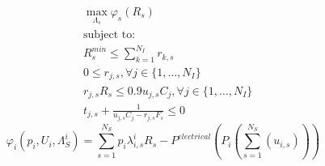 \documentclass[conference]{IEEEtran}
\begin{document}
    \begin{subequations}
      \begin{align}
        &\max_{\Lambda_s} \varphi_s(R_s) \\
        &\text{subject to:} \nonumber \\
        &R_s^{min} \le \sum_{k=1}^{N_I}{r_{k,s}} \\
        &0 \le r_{j,s}, \forall j \in \{1, \hdots,N_I\} \\
        &r_{j,s} R_s \le 0.9 u_{j,s} C_j, \forall j \in \{1, \hdots,N_I\} \\
        &t_{j,s} +  \frac{1}{u_{j,s} C_j - r_{j,s} F_s} \le 0
      \end{align}
    \end{subequations}
    \begin{equation}
      \varphi_i(p_i, U_i, \Lambda_S^i)=\sum_{s=1}^{N_S}{p_i \lambda_{i,s}^i R_s} - P^{electrical}(P_i(\sum_{s=1}^{N_S}(u_{i,s})))
    \end{equation}
\end{document}
